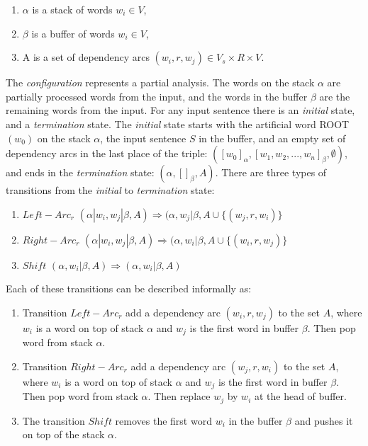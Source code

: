 \documentclass[10pt]{article}
\begin{document}
\begin{enumerate}
\item $\alpha$ is a stack of words $w_i \in V$,
\item $\beta$ is a buffer of words $w_i \in V$,
\item A is a set of dependency arcs $(w_i, r, w_j) \in V_s \times R \times V$.
\end{enumerate}

The \textit{configuration} represents a partial analysis. The words on the stack $\alpha$ are partially processed words from the input, and the words in the buffer $\beta$ are the remaining words from the input. For any input sentence there is an \textit{initial} state, and a \textit{termination} state. The \textit{initial} state starts with the artificial word ROOT $(w_0)$ on the stack $\alpha$, the input sentence $S$ in the buffer, and an empty set of dependency arcs in the last place of the triple: $([w_0]_\alpha, [w_1, w_2, ..., w_n]_\beta, \emptyset)$, and ends in the \textit{termination} state: $(\alpha, []_\beta, A)$. There are three types of transitions from the \textit{initial} to \textit{termination} state:

\begin{enumerate}
\item $Left-Arc_r$ $(\alpha|w_i, w_j|\beta, A) \Rightarrow (\alpha, w_j|\beta, A \cup \{(w_j, r, w_i)\}$
\item $Right-Arc_r$ $(\alpha|w_i, w_j|\beta, A) \Rightarrow (\alpha, w_i|\beta, A \cup \{(w_i, r, w_j)\}$
\item $Shift$ $(\alpha, w_i|\beta, A) \Rightarrow (\alpha, w_i|\beta, A)$
\end{enumerate}

Each of these transitions can be described informally as:

\begin{enumerate}
\item Transition $Left-Arc_r$ add a dependency arc $(w_i, r, w_j)$ to the set $A$, where $w_i$ is a word on top of stack $\alpha$ and $w_j$ is the first word in buffer $\beta$. Then pop word from stack $\alpha$.
\item Transition $Right-Arc_r$ add a dependency arc $(w_j, r, w_i)$ to the set $A$, where $w_i$ is a word on top of stack $\alpha$ and $w_j$ is the first word in buffer $\beta$. Then pop word from stack $\alpha$. Then replace $w_j$ by $w_i$ at the head of buffer. 
\item The transition $Shift$ removes the first word $w_i$ in the buffer $\beta$ and pushes it on top of the stack $\alpha$. 
\end{enumerate}
\end{document}
